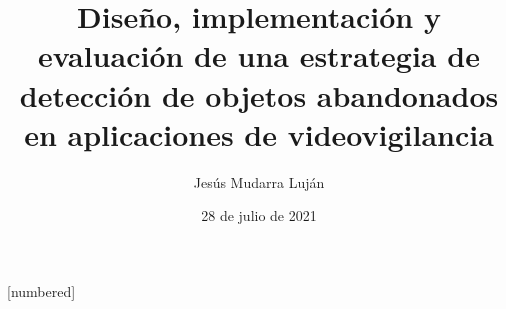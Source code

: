 
\usepackage[spanish]{babel}
\usepackage{fontspec}
\usepackage{tikz}
\usepackage{etoolbox}
\usepackage{listings}
\usepackage{ragged2e} %
\usepackage{subcaption} %

[numbered]

\title[Trabajo Fin de Máster]{Diseño, implementación y evaluación de una estrategia de detección de objetos abandonados en aplicaciones de videovigilancia}
\author{Jesús Mudarra Luján}
\date{28 de julio de 2021}

\setNavigation
\newcommand{\opacidad}{1}
\renewcommand{\logoCuatro}{Images/logos/ELogo.png}
\footlineA
